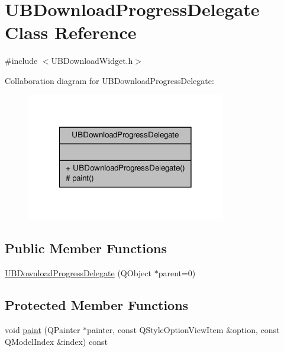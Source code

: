 \hypertarget{class_u_b_download_progress_delegate}{\section{U\-B\-Download\-Progress\-Delegate Class Reference}
\label{d3/d80/class_u_b_download_progress_delegate}
}


{\ttfamily \#include $<$U\-B\-Download\-Widget.\-h$>$}



Collaboration diagram for U\-B\-Download\-Progress\-Delegate\-:
\nopagebreak
\begin{figure}[H]
\begin{center}
\leavevmode
\includegraphics[width=246pt]{d9/d97/class_u_b_download_progress_delegate__coll__graph}
\end{center}
\end{figure}
\subsection*{Public Member Functions}
\begin{DoxyCompactItemize}
\item 
\hyperlink{class_u_b_download_progress_delegate_a4dc79fc144e30078fbc041499fb2992b}{U\-B\-Download\-Progress\-Delegate} (Q\-Object $\ast$parent=0)
\end{DoxyCompactItemize}
\subsection*{Protected Member Functions}
\begin{DoxyCompactItemize}
\item 
void \hyperlink{class_u_b_download_progress_delegate_a36ffec20af249f31cdb54a2ecd46e66d}{paint} (Q\-Painter $\ast$painter, const Q\-Style\-Option\-View\-Item \&option, const Q\-Model\-Index \&index) const 
\end{DoxyCompactItemize}


